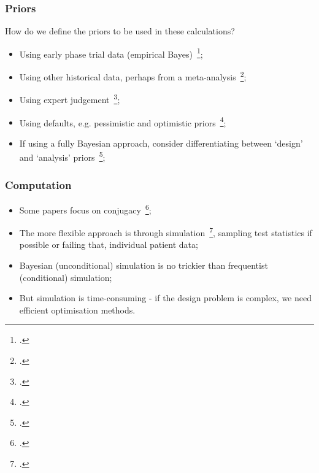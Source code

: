 \documentclass{beamer}
\begin{document}
\begin{frame}
\frametitle{Priors}
How do we define the priors to be used in these calculations?
\begin{itemize}
\item Using early phase trial data (empirical Bayes)~\footcite{Jiang2011};
\item Using other historical data, perhaps from a meta-analysis~\footcite{Sutton2007};
\item Using expert judgement~\footcite{Ren2013};
\item Using defaults, e.g. pessimistic and optimistic priors~\footcite{Spiegelhalter2004};
\item If using a fully Bayesian approach, consider differentiating between `design' and `analysis' priors~\footcite{Wang2002};
\end{itemize}
\end{frame}


\begin{frame}
\frametitle{Computation}
\begin{itemize}
\item Some papers focus on conjugacy~\footcite{Ibrahim2014};
\item The more flexible approach is through simulation~\footcite{Wang2013}, sampling test statistics if possible or failing that, individual patient data;
\item Bayesian (unconditional) simulation is no trickier than frequentist (conditional) simulation;
\item But simulation is time-consuming - if the design problem is complex, we need efficient optimisation methods.
\end{itemize}
\end{frame}
\end{document}
